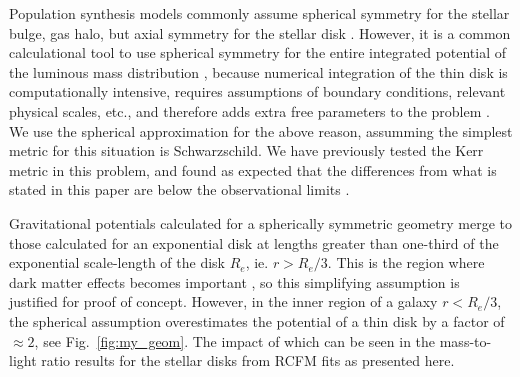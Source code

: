 \documentclass[reprint,%
 amsmath,amssymb,
 aps,
]{revtex4-1}
\begin{document}
   Population synthesis models commonly assume spherical symmetry for the 
  stellar bulge, gas halo, but   axial symmetry for    the stellar disk \cite{1954AJ.....59..273S,Freeman}.
 However, it is a common calculational  tool to use spherical symmetry for the entire integrated potential of the luminous mass distribution  \cite{2022A&A...664A..40M,PhysRevD.70.083509}, because numerical integration of the thin disk is  computationally intensive,  requires assumptions of  boundary conditions,   relevant physical scales,  etc., and therefore adds extra free parameters to the problem \cite{2011A&A...531A..36H}.  
 We   use the spherical approximation   for the above reason, assumming   the simplest metric for this situation  is 
 Schwarzschild. We have previously tested  the Kerr metric in this problem, and found as expected  that the   differences from what is stated in this paper are below the   observational limits \cite{Cisn}. 
 
Gravitational potentials calculated for  a spherically symmetric  geometry   
  merge to those calculated for an exponential disk  at lengths greater than one-third of the exponential scale-length of the disk $R_e$, ie.  $r> R_e/3$\cite{Chatterjee}. This is the region  where dark matter effects becomes important \cite{1985ApJAlbada}, so this simplifying assumption is justified for proof of concept. 
However,  in the inner region of a galaxy $r< R_e/3$,  the spherical assumption   
    overestimates the potential of a thin disk by a factor of $\approx  2$, see Fig.~\ref{fig:my_geom}. The impact of which can be seen in the     mass-to-light ratio results for the stellar disks from RCFM fits as presented here. 
 
\end{document}
